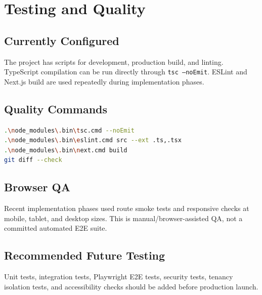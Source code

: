 \chapter{Testing and Quality}
\section{Currently Configured}
The project has scripts for development, production build, and linting. TypeScript compilation can be run directly through \texttt{tsc --noEmit}. ESLint and Next.js build are used repeatedly during implementation phases.

\section{Quality Commands}
\begin{lstlisting}[language=bash]
.\node_modules\.bin\tsc.cmd --noEmit
.\node_modules\.bin\eslint.cmd src --ext .ts,.tsx
.\node_modules\.bin\next.cmd build
git diff --check
\end{lstlisting}

\section{Browser QA}
Recent implementation phases used route smoke tests and responsive checks at mobile, tablet, and desktop sizes. This is manual/browser-assisted QA, not a committed automated E2E suite.

\section{Recommended Future Testing}
Unit tests, integration tests, Playwright E2E tests, security tests, tenancy isolation tests, and accessibility checks should be added before production launch.
